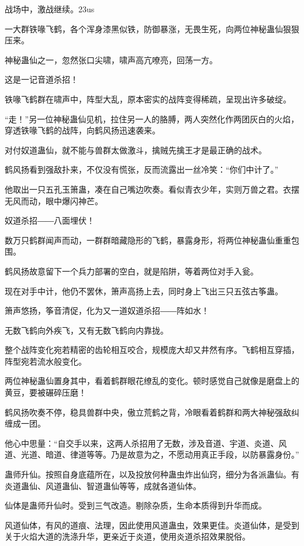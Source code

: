 
\begin{this_body}

战场中，激战继续。23us

一大群铁喙飞鹤，各个浑身漆黑似铁，防御暴涨，无畏生死，向两位神秘蛊仙狠狠压来。

神秘蛊仙之一，忽然张口尖啸，啸声高亢嘹亮，回荡一方。

这是一记音道杀招！

铁喙飞鹤群在啸声中，阵型大乱，原本密实的战阵变得稀疏，呈现出许多破绽。

“走！”另一位神秘蛊仙见机，拉住另一人的胳膊，两人突然化作两团灰白的火焰，穿透铁喙飞鹤的战阵，向鹤风扬迅速袭来。

对付奴道蛊仙，就不能与兽群太做激斗，擒贼先擒王才是最正确的战术。

鹤风扬看到强敌扑来，不仅没有慌张，反而流露出一丝冷笑：“你们中计了。”

他取出一只五孔玉箫蛊，凑在自己嘴边吹奏。看似青衣少年，实则万兽之君。衣摆无风而动，眼中爆闪神芒。

奴道杀招――八面埋伏！

数万只鹤群闻声而动，一群群暗藏隐形的飞鹤，暴露身形，将两位神秘蛊仙重重包围。

鹤风扬故意留下一个兵力部署的空白，就是陷阱，等着两位对手入瓮。

现在对手中计，他仍不罢休，箫声高扬上去，同时身上飞出三只五弦古筝蛊。

箫声悠扬，筝音清促，化为又一道奴道杀招――阵如水！

无数飞鹤向外疾飞，又有无数飞鹤向内靠拢。

整个战阵变化宛若精密的齿轮相互咬合，规模庞大却又井然有序。飞鹤相互穿插，阵型宛若流水般变化。

两位神秘蛊仙置身其中，看着鹤群眼花缭乱的变化。顿时感觉自己就像是磨盘上的黄豆，要被碾碎压磨！

鹤风扬吹奏不停，稳具兽群中央，傲立荒鹤之背，冷眼看着鹤群和两大神秘强敌纠缠成一团。

他心中思量：“自交手以来，这两人杀招用了无数，涉及音道、宇道、炎道、风道、光道、暗道、律道等等。乃是故意为之，不愿动用真正手段，以防暴露身份。”

蛊师升仙。按照自身底蕴所在，以及投放何种蛊虫炸出仙窍，细分为各派蛊仙。有炎道蛊仙、风道蛊仙、智道蛊仙等等，成就各道仙体。

仙体是蛊师升仙时。受到三气改造。剔除杂质，生命本质得到升华而成。

风道仙体，有风的道痕、法理，因此使用风道蛊虫，效果更佳。炎道仙体，是受到关于火焰大道的洗涤升华，更亲近于炎道，使用炎道杀招效果脱俗。


\end{this_body}
